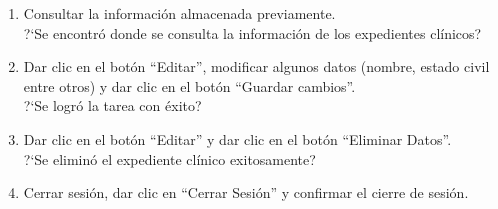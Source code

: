 \begin{enumerate}
{			$\bullet$ Estado Civil: Soltero\\
			$\bullet$ SAML960728HOCNRS01\\
			$\bullet$ Sexo: Hombre\\
			$\bullet$ Lengua Materna: Español\\
			$\bullet$ Otro idioma: Inglés\\	
	?`El sistema mostró retroalimentación de la generación exitosa de los expedientes clínicos?
	}
	\item {Consultar la información almacenada previamente.\\	
	?`Se encontró donde se consulta la información de los expedientes clínicos?
	}
	\item {Dar clic en el botón ``Editar'', modificar algunos datos (nombre, estado civil entre otros) y dar clic en el botón ``Guardar cambios''.\\	
	?`Se logró la tarea con éxito?
	}
	\item {Dar clic en el botón ``Editar'' y dar clic en el botón ``Eliminar Datos''.\\	
	?`Se eliminó el expediente clínico exitosamente?
	}
	\item {Cerrar sesión, dar clic en ``Cerrar Sesión'' y confirmar el cierre de sesión.\\	
}
\end{enumerate}
